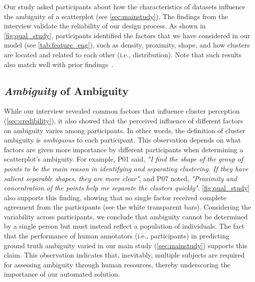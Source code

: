 Our study asked participants about how the characteristics of datasets influence the ambiguity of a scatterplot (see \autoref{sec:mainstudy}). The findings from the interview validate the reliability of our design process. As shown in \autoref{fig:qual_study}, participants identified the factors that we have considered in our model (see \autoref{tab:feature_eng}), such as density, proximity, shape, and how clusters are located and related to each other (i.e., distribution). 
Note that such results also match well with prior findings~\cite{sedlmair2015data, sadahiro1997cluster,quadri21tvcg}. 

\subsection{\textit{Ambiguity} of Ambiguity}

While our interview revealed common factors that influence cluster perception (\autoref{sec:credibility}), it also showed that the perceived influence of different factors on ambiguity varies among participants. In other words, the definition of cluster ambiguity is \textit{ambiguous} to each participant. 
This observation depends on what factors are given more importance by different participants when determining a scatterplot's ambiguity.
For example, P01 said, \textit{"I find the shape of the group of points to be the main reason in identifying and separating clustering. If they have salient separable shapes, they are more clear"}, and P07 noted, \textit{"Proximity and concentration of the points help me separate the clusters quickly"}. 
\autoref{fig:qual_study} also supports this finding, showing that no single factor received complete agreement from the participants (see the white transparent bars).
Considering the variability across participants,
we conclude that ambiguity cannot be determined by a single person but must instead reflect a population of individuals. 
The fact that the performance of human annotators (i.e., participants) in predicting ground truth ambiguity varied in our main study (\autoref{sec:mainstudy}) supports this claim.
This observation indicates that, inevitably, multiple subjects are required for assessing ambiguity through human resources, thereby underscoring the importance of our automated solution.

